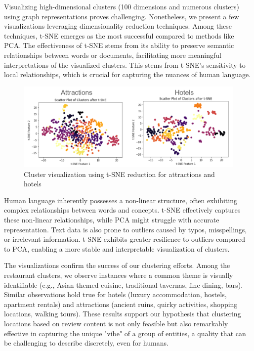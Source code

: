\documentclass[12pt,a4paper]{report}
\begin{document}
Visualizing high-dimensional clusters (100 dimensions and numerous clusters) using graph representations proves challenging.  Nonetheless, we present a few visualizations leveraging dimensionality reduction techniques.  Among these techniques, t-SNE emerges as the most successful compared to methods like PCA. The effectiveness of t-SNE stems from its ability to preserve semantic relationships between words or documents, facilitating more meaningful interpretations of the visualized clusters.  This stems from t-SNE's sensitivity to local relationships, which is crucial for capturing the nuances of human language\citep{JMLR:v9:vandermaaten08a}.

\begin{figure}[H]
    \centering
    \includegraphics[scale=.6]{scatterplot1}
    \caption{Cluster visualization using t-SNE reduction for attractions and hotels}
\end{figure}

Human language inherently possesses a non-linear structure, often exhibiting complex relationships between words and concepts.  t-SNE effectively captures these non-linear relationships, while PCA might struggle with accurate representation.  Text data is also prone to outliers caused by typos, misspellings, or irrelevant information.  t-SNE exhibits greater resilience to outliers compared to PCA, enabling a more stable and interpretable visualization of clusters.

The visualizations confirm the success of our clustering efforts.  Among the restaurant clusters, we observe instances where a common theme is visually identifiable (e.g., Asian-themed cuisine, traditional tavernas, fine dining, bars).  Similar observations hold true for hotels (luxury accommodation, hostels, apartment rentals) and attractions (ancient ruins, quirky activities, shopping locations, walking tours).  These results support our hypothesis that clustering locations based on review content is not only feasible but also remarkably effective in capturing the unique "vibe" of a group of entities, a quality that can be challenging to describe discretely, even for humans.
\end{document}
